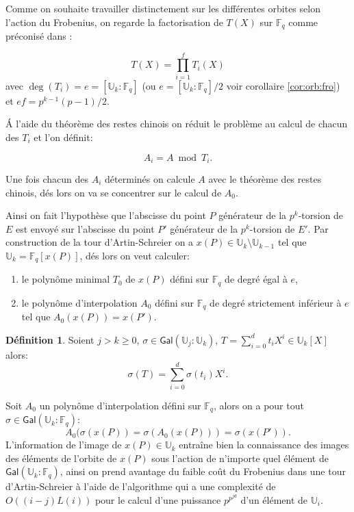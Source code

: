 \documentclass[10pt,a4paper]{book}
\theoremstyle{plain}
\theoremstyle{definition}
\theoremstyle{definition}
\theoremstyle{definition}
\theoremstyle{definition}
\newtheorem{defi}[thm]{Définition}
\theoremstyle{remark}
\theoremstyle{remark}
\begin{document}
Comme on souhaite travailler distinctement sur les différentes orbites selon l'action du Frobenius, on regarde la factorisation de $T(X)$ sur $\mathbb{F}_q$ comme préconisé dans \cite{Couveignes96}:

\begin{equation*}
T(X)=\prod_{i=1}^fT_{i}(X)
\end{equation*}
avec $\deg(T_i)=e=[\mathbb{U}_k:\mathbb{F}_q]$ (ou $e=[\mathbb{U}_k:\mathbb{F}_q]/2$ voir corollaire \ref{cor:orb:fro}) et $ef=p^{k-1}(p-1)/2$.

\'A l'aide du théorème des restes chinois on réduit le problème au calcul de chacun des $T_{i}$ et l'on définit:

\begin{equation}
A_{i}=A \bmod{T_{i}}.
\end{equation}

Une fois chacun des $A_{i}$ déterminés on calcule $A$ avec le théorème des restes chinois, dés lors on va se concentrer sur le calcul de $A_{0}$.


Ainsi on fait l'hypothèse que l'abscisse du point $P$ générateur de la $p^k$-torsion de $E$ est envoyé sur l'abscisse du point $P'$ générateur de la $p^k$-torsion de $E'$. Par construction de la tour d'Artin-Schreier on a $x(P) \in \mathbb{U}_k \setminus \mathbb{U}_{k-1}$ tel que $\mathbb{U}_k=\mathbb{F}_q[x(P)]$, dés lors on veut calculer: 
\begin{enumerate}
\item le polynôme minimal $T_{0}$ de $x(P)$ défini sur $\mathbb{F}_q$ de degré égal à $e$,
\item le polynôme d'interpolation $A_0$ défini sur $\mathbb{F}_q$ de degré strictement inférieur à $e$ tel que $A_0(x(P))=x(P')$.
\end{enumerate}

\begin{defi}
Soient $j > k \geqslant 0$, $\sigma \in \mathsf{Gal}(\mathbb{U}_j:\mathbb{U}_k)$, $T=\sum_{i=0}^{d}t_iX^i \in \mathbb{U}_k[X]$ alors:
\[
\sigma(T)=\sum_{i=0}^{d}\sigma(t_i)X^i.
\]   
\end{defi}

Soit $A_0$ un polynôme d'interpolation défini sur $\mathbb{F}_q$, alors on a pour tout $\sigma \in \mathsf{Gal}(\mathbb{U}_k:\mathbb{F}_q)$:
\begin{equation*}
A_0(\sigma(x(P))=\sigma(A_0(x(P)))=\sigma(x(P')).
\end{equation*}
L'information de l'image de $x(P) \in \mathbb{U}_k$ entraîne bien la connaissance des images des éléments de l'orbite de $x(P)$ sous l'action de n'importe quel élément de $\mathsf{Gal}(\mathbb{U}_k:\mathbb{F}_q)$, ainsi on prend avantage du faible coût du Frobenius dans une tour d'Artin-Schreier à l'aide de l'algorithme \cite[Iter Frobenius,Theorem 17 et 18]{DeFeo-Shost'12} qui a une complexité de $O((i-j)L(i))$ pour le calcul d'une puissance $p^{p^{jd}}$ d'un élément de $\mathbb{U}_i$.
\end{document}
